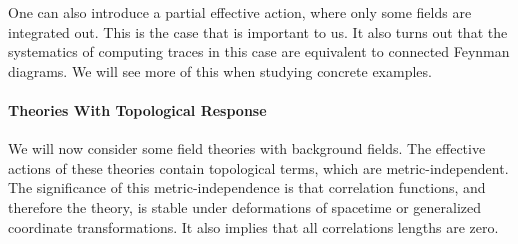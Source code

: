 One can also introduce a partial effective action, where only some fields are integrated out. This is the case that is important to us. It also turns out that the systematics of computing traces in this case are equivalent to connected Feynman diagrams. We will see more of this when studying concrete examples.

\paragraph{Theories With Topological Response}
We will now consider some field theories with background fields. The effective actions of these theories contain topological terms, which are metric-independent. The significance of this metric-independence is that correlation functions, and therefore the theory, is stable under deformations of spacetime or generalized coordinate transformations. It also implies that all correlations lengths are zero.

